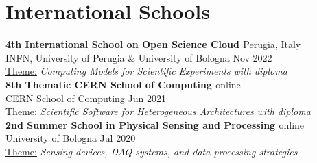 \newcommand{\event}[2]
  {\normalsize \textbf{\color{hlcolor-0} #1} \hfill {\color{hlcolor-2} #2}}

\newcommand{\organizer}[2]
  {\small \color{hlcolor-1} {#1} \hfill {#2}}

\newcommand{\theme}[1]
  {\normalsize \color{maincolor} \ul{Theme:} \emph{#1}}

\newcommand{\outcome}[1]
  {\normalsize \color{hlcolor-2} \emph{#1}}
  

\section*{International Schools}
\begin{cvcontent}
  \event{4th International School on Open Science Cloud 
    \href{https://agenda.infn.it/event/31408}{\faGlobe}}
    {Perugia, Italy}\\ [0.5mm]
  \organizer{INFN, University of Perugia \& University of Bologna}
    {Nov 2022}\\ [0.5mm]
  \theme{Computing Models for Scientific Experiments}
    \hfill \outcome{with diploma}
   \\ [5mm]
  \event{8th Thematic CERN School of Computing
    \href{https://indico.cern.ch/event/1017080}{\faGlobe}}
    {online}\\ [0.5mm]
  \organizer{CERN School of Computing}{Jun 2021}\\ [0.5mm]
  \theme{Scientific Software for Heterogeneous Architectures}
    \hfill \hfill \outcome{with diploma}
  \\ [5mm]
  \event{2nd Summer School in Physical Sensing and Processing
    \href{https://site.unibo.it/school-physical-sensing-and-processing/en/past-editions/2nd-edition-20-24-july-2020}{\faGlobe}}
    {online}\\ [0.5mm]
  \organizer{University of Bologna}{Jul 2020}\\ [0.5mm]
  \theme{Sensing devices, DAQ systems, and data processing strategies}
    \hfill \hfill \outcome{-}
\end{cvcontent}